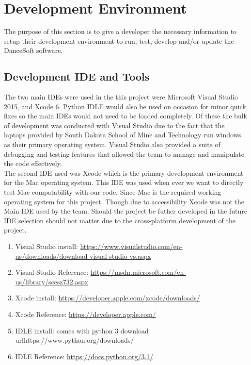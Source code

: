 \chapter{Development Environment}
The purpose of this section is to give a developer the necessary information to setup their development environment to run, test, develop and/or update the DanceSoft software. 


\section{Development IDE and Tools}
The two main IDEs were used in the this project were Microsoft Visual Studio 2015, and Xcode 6. Python IDLE would also be used on occasion for minor quick fixes so the main IDEs would not need to be loaded completely. Of these the bulk of development was conducted with Visual Studio due to the fact that the laptops provided by South Dakota School of Mine and Technology run windows as their primary operating system. Visual Studio also provided a suite of debugging and testing features that allowed the team to manage and manipulate the code effectively.\\
The second IDE used was Xcode which is the primary development environment for the Mac operating system. This IDE was used when ever we want to directly test Mac compatability with our code. Since Mac is the required working operating system for this project. Though due to accessibility Xcode was not the Main IDE used by the team. Should the project be futher developed in the future IDE selection should not matter due to the cross-platform development of the project.

\begin{enumerate}
\item Visual Studio install: \url{https://www.visualstudio.com/en-us/downloads/download-visual-studio-vs.aspx}
\item Visual Studio Reference: \url{https://msdn.microsoft.com/en-us/library/scesz732.aspx}
\item Xcode install: \url{https://developer.apple.com/xcode/downloads/}
\item Xcode Reference: \url{https://developer.apple.com/}
\item IDLE install: comes with python 3 download url{https://www.python.org/downloads/}
\item IDLE Reference: \url{https://docs.python.org/3.1/}
\end{enumerate}

